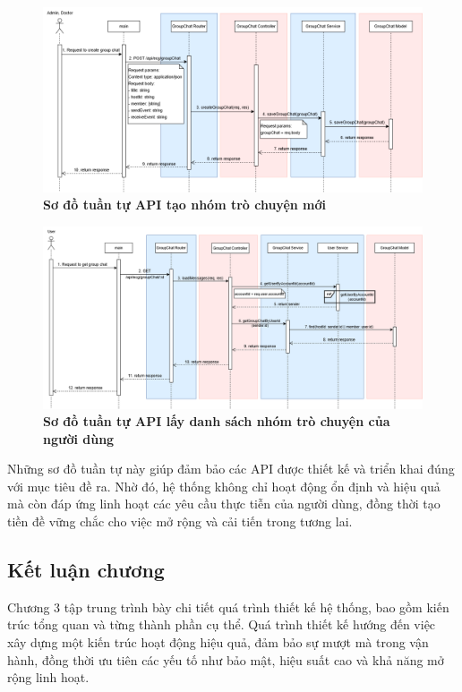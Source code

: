 \begin{figure}[H]
	\centering
	\includegraphics[width=16cm]{Images/api_sequence/chat/createGroupChat.drawio.png}
	\caption[Sơ đồ tuần tự API tạo nhóm trò chuyện mới]{\bfseries \fontsize{12pt}{0pt}\selectfont Sơ đồ tuần tự API tạo nhóm trò chuyện mới}
	\label{sequence_diagram_create_group_chat}
\end{figure}

\begin{figure}[H]
	\centering
	\includegraphics[width=16cm]{Images/api_sequence/chat/getGroupChat.drawio.png}
	\caption[Sơ đồ tuần tự API lấy danh sách nhóm trò chuyện của người dùng]{\bfseries \fontsize{12pt}{0pt}\selectfont Sơ đồ tuần tự API lấy danh sách nhóm trò chuyện của người dùng}
	\label{sequence_diagram_get_group_chat}
\end{figure}

Những sơ đồ tuần tự này giúp đảm bảo các API được thiết kế và triển khai đúng với mục tiêu đề ra.
Nhờ đó, hệ thống không chỉ hoạt động ổn định và hiệu quả mà còn đáp ứng linh hoạt các yêu cầu thực tiễn của người dùng,
đồng thời tạo tiền đề vững chắc cho việc mở rộng và cải tiến trong tương lai.

\subsection{Kết luận chương}

Chương 3 tập trung trình bày chi tiết quá trình thiết kế hệ thống, bao gồm kiến trúc tổng quan và từng thành phần cụ thể.
Quá trình thiết kế hướng đến việc xây dựng một kiến trúc hoạt động hiệu quả, đảm bảo sự mượt mà trong vận hành,
đồng thời ưu tiên các yếu tố như bảo mật, hiệu suất cao và khả năng mở rộng linh hoạt.
\newpage